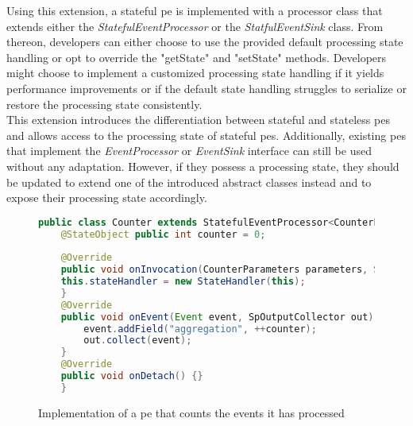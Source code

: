 Using this extension, a stateful \gls{pe} is implemented with a processor class that extends either the \textit{StatefulEventProcessor} or the \textit{StatfulEventSink} class. From thereon, developers can either choose to use the provided default processing state handling or opt to override the "getState" and "setState" methods. Developers might choose to implement a customized processing state handling if it yields performance improvements or if the default state handling struggles to serialize or restore the processing state consistently.\\
This extension introduces the differentiation between stateful and stateless \gls{pe}s and allows access to the processing state of stateful \gls{pe}s. Additionally, existing \gls{pe}s that implement the \textit{EventProcessor} or \textit{EventSink} interface can still be used without any adaptation. However, if they possess a processing state, they should be updated to extend one of the introduced abstract classes instead and to expose their processing state accordingly.\par

\begin{figure}[H]
    \begin{lstlisting}[language=Java]
    public class Counter extends StatefulEventProcessor<CounterParameters> {
    @StateObject public int counter = 0;
    
    @Override
    public void onInvocation(CounterParameters parameters, SpOutputCollector spOutputCollector, EventProcessorRuntimeContext runtimeContext) { 
    this.stateHandler = new StateHandler(this);
    }
    @Override
    public void onEvent(Event event, SpOutputCollector out) {
        event.addField("aggregation", ++counter);
        out.collect(event);
    }
    @Override
    public void onDetach() {}
    }
    \end{lstlisting}
    \caption{Implementation of a \gls{pe} that counts the events it has processed}
    \label{fCounterImplementation}
\end{figure}


